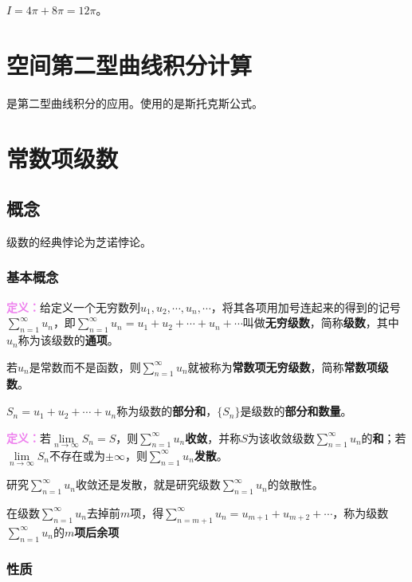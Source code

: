 \documentclass[UTF8, 12pt]{ctexart}
\begin{document}
        $I=4\pi+8\pi=12\pi$。

        \section{空间第二型曲线积分计算}

        是第二型曲线积分的应用。使用的是斯托克斯公式。

        \section{常数项级数}

        \subsection{概念}

        级数的经典悖论为芝诺悖论。

        \subsubsection{基本概念}

        \textcolor{violet}{\textbf{定义：}}给定义一个无穷数列$u_1,u_2,\cdots,u_n,\cdots$，将其各项用加号连起来的得到的记号$\sum\limits_{n=1}^\infty u_n$，即$\sum\limits_{n=1}^\infty u_n=u_1+u_2+\cdots+u_n+\cdots$叫做\textbf{无穷级数}，简称\textbf{级数}，其中$u_n$称为该级数的\textbf{通项}。

        若$u_n$是常数而不是函数，则$\sum\limits_{n=1}^\infty u_n$就被称为\textbf{常数项无穷级数}，简称\textbf{常数项级数}。

        $S_n=u_1+u_2+\cdots+u_n$称为级数的\textbf{部分和}，$\{S_n\}$是级数的\textbf{部分和数量}。

        \textcolor{violet}{\textbf{定义：}}若$\lim\limits_{n\to\infty}S_n=S$，则$\sum\limits_{n=1}^\infty u_n$\textbf{收敛}，并称$S$为该收敛级数$\sum\limits_{n=1}^\infty u_n$的\textbf{和}；若$\lim\limits_{n\to\infty}S_n$不存在或为$\pm\infty$，则$\sum\limits_{n=1}^\infty u_n$\textbf{发散}。

        研究$\sum\limits_{n=1}^\infty u_n$收敛还是发散，就是研究级数$\sum\limits_{n=1}^\infty u_n$的敛散性。

        在级数$\sum\limits_{n=1}^\infty u_n$去掉前$m$项，得$\sum\limits_{n=m+1}^\infty u_n=u_{m+1}+u_{m+2}+\cdots$，称为级数$\sum\limits_{n=1}^\infty u_n$的\textbf{$m$项后余项}

        \subsubsection{性质}
\end{document}
